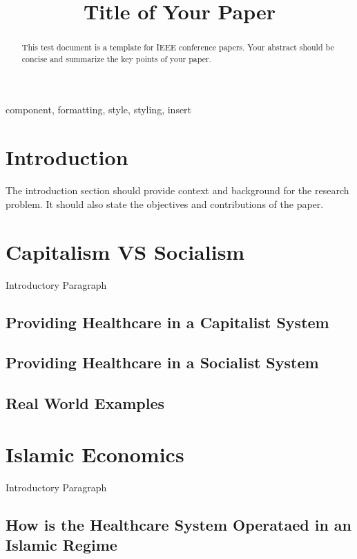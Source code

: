 \documentclass[conference]{IEEEtran}
\begin{document}
\title{Title of Your Paper}

\author{
}

\maketitle

\begin{abstract}
This test document is a template for IEEE conference papers. Your abstract should be concise and summarize the key points of your paper.
\end{abstract}

\begin{IEEEkeywords}
component, formatting, style, styling, insert
\end{IEEEkeywords}

\section{Introduction}
The introduction section should provide context and background for the research problem. It should also state the objectives and contributions of the paper.

\section{Capitalism VS Socialism}
Introductory Paragraph
\subsection{Providing Healthcare in a Capitalist System}
\subsection{Providing Healthcare in a Socialist System}
\subsection{Real World Examples}

\section{Islamic Economics}
Introductory Paragraph
\subsection{How is the Healthcare System Operataed in an Islamic Regime}
\end{document}
